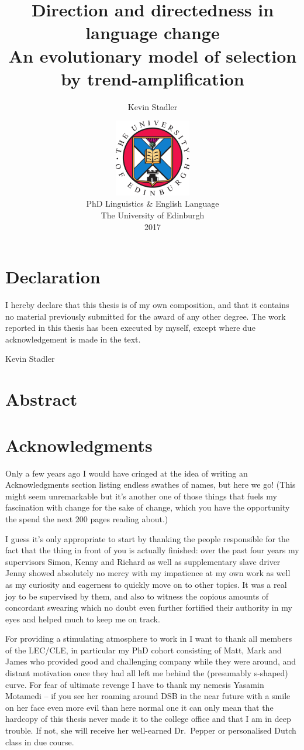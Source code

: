 \documentclass[twoside,10pt]{book}
\author{Kevin Stadler}
\title{Direction and directedness in language change\\\large An evolutionary model of selection by trend-amplification}
\date{\vfill\includegraphics[width=0.25\textwidth]{edcrest}\\
\vspace{1em}
PhD Linguistics \& English Language\\
The University of Edinburgh\\
2017}
\begin{document}

\maketitle

\frontmatter

\chapter*{Declaration}
I hereby declare that this thesis is of my own composition, and that it contains no material previously submitted for the award of any other degree. The work reported in this thesis has been executed by myself, except where due
acknowledgement is made in the text.

\vspace{1in}\hfill Kevin Stadler

\chapter*{Abstract}


\chapter*{Acknowledgments}

Only a few years ago I would have cringed at the idea of writing an Acknowledgments section listing endless swathes of names, but here we go! (This might seem unremarkable but it's another one of those things that fuels my fascination with change for the sake of change, which you have the opportunity the spend the next 200 pages reading about.)

I guess it's only appropriate to start by thanking the people responsible for the fact that the thing in front of you is actually finished: over the past four years my supervisors Simon, Kenny and Richard as well as supplementary slave driver Jenny showed absolutely no mercy with my impatience at my own work as well as my curiosity and eagerness to quickly move on to other topics. It was a real joy to be supervised by them, and also to witness the copious amounts of concordant swearing which no doubt even further fortified their authority in my eyes and helped much to keep me on track.

For providing a stimulating atmosphere to work in I want to thank all members of the LEC/CLE, in particular my PhD cohort consisting of Matt, Mark and James who provided good and challenging company while they were around, and distant motivation once they had all left me behind the (presumably s-shaped) curve.
For fear of ultimate revenge I have to thank my nemesis Yasamin Motamedi -- if you see her roaming around DSB in the near future with a smile on her face even more evil than here normal one it can only mean that the hardcopy of this thesis never made it to the college office and that I am in deep trouble. If not, she will receive her well-earned Dr.~Pepper or personalised Dutch class in due course.
\end{document}
